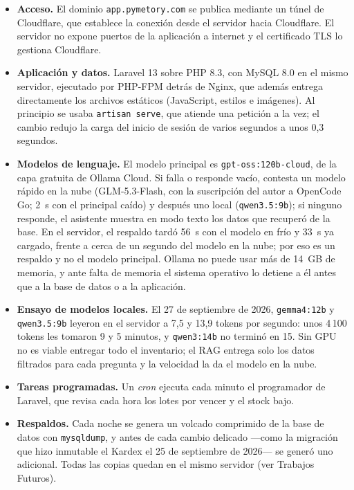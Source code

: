 \begin{itemize}
    \item \textbf{Acceso.} El dominio \texttt{app.pymetory.com} se publica mediante un túnel de Cloudflare, que establece la conexión desde el servidor hacia Cloudflare. El servidor no expone puertos de la aplicación a internet y el certificado TLS lo gestiona Cloudflare.
    \item \textbf{Aplicación y datos.} Laravel 13 sobre PHP 8.3, con MySQL 8.0 en el mismo servidor, ejecutado por PHP-FPM detrás de Nginx, que además entrega directamente los archivos estáticos (JavaScript, estilos e imágenes). Al principio se usaba \texttt{artisan serve}, que atiende una petición a la vez; el cambio redujo la carga del inicio de sesión de varios segundos a unos 0,3 segundos.
    \item \textbf{Modelos de lenguaje.} El modelo principal es \texttt{gpt-oss:120b-cloud}, de la capa gratuita de Ollama Cloud. Si falla o responde vacío, contesta un modelo rápido en la nube (GLM-5.3-Flash, con la suscripción del autor a OpenCode Go; 2~s con el principal caído) y después uno local (\texttt{qwen3.5:9b}); si ninguno responde, el asistente muestra en modo texto los datos que recuperó de la base. En el servidor, el respaldo tardó 56~s con el modelo en frío y 33~s ya cargado, frente a cerca de un segundo del modelo en la nube; por eso es un respaldo y no el modelo principal. Ollama no puede usar más de 14~GB de memoria, y ante falta de memoria el sistema operativo lo detiene a él antes que a la base de datos o a la aplicación.
    \item \textbf{Ensayo de modelos locales.} El 27 de septiembre de 2026, \texttt{gemma4:12b} y \texttt{qwen3.5:9b} leyeron en el servidor a 7,5 y 13,9 tokens por segundo: unos 4\,100 tokens les tomaron 9 y 5 minutos, y \texttt{qwen3:14b} no terminó en 15. Sin GPU no es viable entregar todo el inventario; el RAG entrega solo los datos filtrados para cada pregunta y la velocidad la da el modelo en la nube.
    \item \textbf{Tareas programadas.} Un \textit{cron} ejecuta cada minuto el programador de Laravel, que revisa cada hora los lotes por vencer y el stock bajo.
    \item \textbf{Respaldos.} Cada noche se genera un volcado comprimido de la base de datos con \texttt{mysqldump}, y antes de cada cambio delicado ---como la migración que hizo inmutable el Kardex el 25 de septiembre de 2026--- se generó uno adicional. Todas las copias quedan en el mismo servidor (ver Trabajos Futuros).
\end{itemize}

